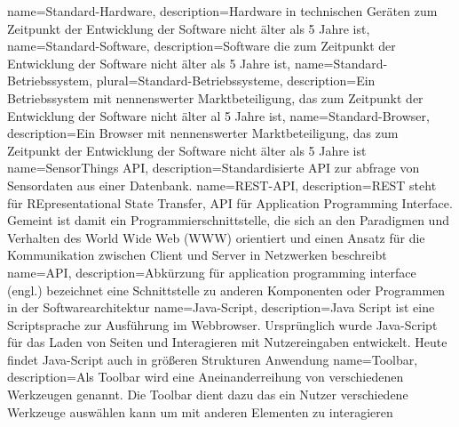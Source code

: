 {
	name=Standard-Hardware,
	description={Hardware in technischen Geräten zum Zeitpunkt der Entwicklung der Software nicht älter als 5 Jahre ist},
}
{
	name=Standard-Software,
	description={Software die zum Zeitpunkt der Entwicklung der Software nicht älter als 5 Jahre ist},
}
{
	name=Standard-Betriebssystem,
	plural=Standard-Betriebssysteme,
	description={Ein Betriebssystem mit nennenswerter Marktbeteiligung, das zum Zeitpunkt der Entwicklung der Software nicht älter al 5 Jahre ist},
}
{
	name=Standard-Browser,
	description={Ein Browser mit nennenswerter Marktbeteiligung, das zum Zeitpunkt der Entwicklung der Software nicht älter als 5 Jahre ist}
}
{
	name=SensorThings \gls{API},
	description={Standardisierte \gls{API} zur abfrage von Sensordaten aus einer Datenbank.}
}
{
	name=REST-\gls{API},
	description={REST steht für REpresentational State Transfer, API für Application Programming Interface. Gemeint ist damit ein Programmierschnittstelle, die sich an den Paradigmen und Verhalten des World Wide Web (WWW) orientiert und einen Ansatz für die Kommunikation zwischen Client und Server in Netzwerken beschreibt}
}
{
	name=API,
	description={Abkürzung für application programming interface (engl.) bezeichnet eine Schnittstelle zu anderen Komponenten oder Programmen in der Softwarearchitektur}
}
{
	name=Java-Script,
	description={Java Script ist eine Scriptsprache zur Ausführung im Webbrowser. Ursprünglich wurde Java-Script für das Laden von Seiten und Interagieren mit Nutzereingaben entwickelt. Heute findet Java-Script auch in größeren Strukturen Anwendung}
}
{
	name=Toolbar,
	description={Als Toolbar wird eine Aneinanderreihung von verschiedenen Werkzeugen genannt. Die Toolbar dient dazu das ein Nutzer verschiedene Werkzeuge auswählen kann um mit anderen Elementen zu interagieren}
}
